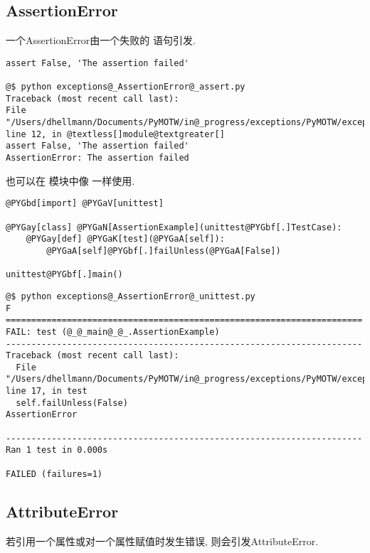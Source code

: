 \documentclass[a4paper,10pt,english]{manual}
\begin{document}
\subsection{AssertionError}

一个AssertionError由一个失败的  语句引发.

\begin{Verbatim}[commandchars=@\[\]]
assert False, 'The assertion failed'

@$ python exceptions@_AssertionError@_assert.py
Traceback (most recent call last):
File "/Users/dhellmann/Documents/PyMOTW/in@_progress/exceptions/PyMOTW/exceptions/exceptions@_AssertionError@_assert.py", line 12, in @textless[]module@textgreater[]
assert False, 'The assertion failed'
AssertionError: The assertion failed
\end{Verbatim}

也可以在  模块中像  一样使用.

\begin{Verbatim}[commandchars=@\[\]]
@PYGbd[import] @PYGaV[unittest]

@PYGay[class] @PYGaN[AssertionExample](unittest@PYGbf[.]TestCase):
    @PYGay[def] @PYGaK[test](@PYGaA[self]):
        @PYGaA[self]@PYGbf[.]failUnless(@PYGaA[False])

unittest@PYGbf[.]main()
\end{Verbatim}

\begin{Verbatim}[commandchars=@\[\]]
@$ python exceptions@_AssertionError@_unittest.py
F
======================================================================
FAIL: test (@_@_main@_@_.AssertionExample)
----------------------------------------------------------------------
Traceback (most recent call last):
  File "/Users/dhellmann/Documents/PyMOTW/in@_progress/exceptions/PyMOTW/exceptions/exceptions@_AssertionError@_unittest.py", line 17, in test
  self.failUnless(False)
AssertionError

----------------------------------------------------------------------
Ran 1 test in 0.000s

FAILED (failures=1)
\end{Verbatim}


\subsection{AttributeError}

若引用一个属性或对一个属性赋值时发生错误, 则会引发AttributeError.
\end{document}
